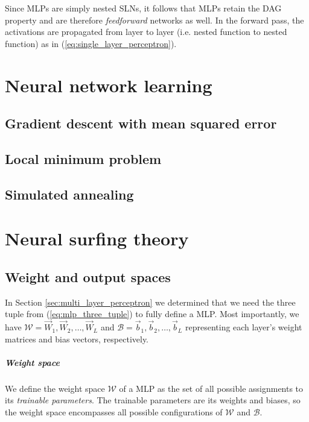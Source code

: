 Since MLPs are simply nested SLNs, it follows that MLPs retain the DAG property and are therefore \textit{feedforward} networks as well.
In the forward pass, the activations are propagated from layer to layer (i.e. nested function to nested function) as in (\ref{eq:single_layer_perceptron}).



\chapter{Neural network learning}
\section{Gradient descent with mean squared error}
\section{Local minimum problem}
\section{Simulated annealing}

\chapter{Neural surfing theory}
\section{Weight and output spaces}
In Section \ref{sec:multi_layer_perceptron} we determined that we need the three tuple from (\ref{eq:mlp_three_tuple}) to fully define a MLP. 
Most importantly, we have $\mathscr{W} = \vec{W}_1, \vec{W}_2, \dots, \vec{W}_L$ and $\mathscr{B} = \vec{b}_1, \vec{b}_2, \dots, \vec{b}_L$ representing each layer's weight matrices and bias vectors, respectively. 

\paragraph{Weight space}
We define the weight space $\mathcal{W}$ of a MLP as the set of all possible assignments to its \textit{trainable parameters}. 
The trainable parameters are its weights and biases, so the weight space encompasses all possible configurations of $\mathscr{W}$ and $\mathscr{B}$. 

